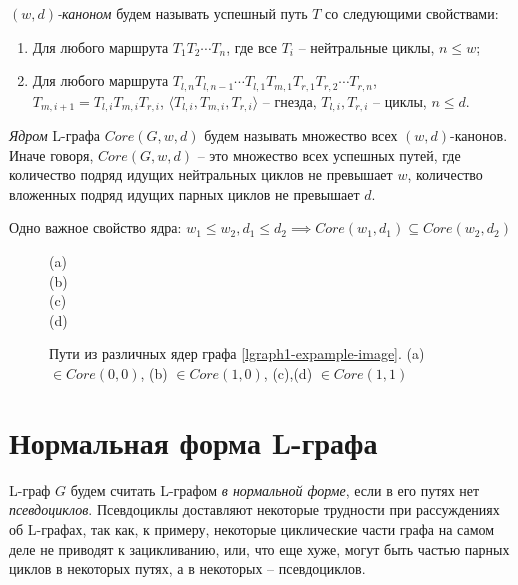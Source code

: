 \emph{$(w,d)$-каноном} будем называть успешный путь $T$ со следующими свойствами:
\begin{enumerate}[label=\arabic*)]
    \item Для любого маршрута $T_1 T_2 \cdots T_n$, где все $T_i$ -- нейтральные циклы, $n \leq w$;
    \item Для любого маршрута $T_{l,n} T_{l,n-1} \cdots T_{l,1} T_{m,1} T_{r,1} T_{r,2} \cdots T_{r,n}$,\\
       $T_{m,i+1} = T_{l,i} T_{m,i} T_{r,i}$, $\langle T_{l,i}, T_{m,i}, T_{r,i} \rangle$ -- гнезда, $T_{l,i}, T_{r,i}$ -- циклы,
       $n \leq d$.
\end{enumerate}

\emph{Ядром} L-графа $Core(G, w, d)$ будем называть множество всех $(w,d)$-канонов. 
Иначе говоря, $Core(G, w, d)$ -- это множество всех успешных путей, 
где количество подряд идущих нейтральных циклов не превышает $w$, 
количество вложенных подряд идущих парных циклов не превышает $d$.  

Одно важное свойство ядра: $w_1 \leq w_2, d_1 \leq d_2 \implies Core(w_1, d_1) \subseteq Core(w_2, d_2)$

\begin{figure}[h]
    \centering
     (a)\\
     (b)\\
     (c)\\
     (d)\\
    
    \caption{Пути из различных ядер графа \ref{lgraph1-expample-image}. (a) $\in Core(0,0)$, (b) $\in Core(1,0)$, (c),(d) $\in Core(1,1)$}
    \label{lgraph1-core-example}
\end{figure}

\section{Нормальная форма L-графа}

L-граф $G$ будем считать L-графом \emph{в нормальной форме}, если в его путях нет \emph{псевдоциклов}.
Псевдоциклы доставляют некоторые трудности при рассуждениях об L-графах, так как, к примеру,
некоторые циклические части графа на самом деле не приводят к зацикливанию, или, что еще хуже, могут
быть частью парных циклов в некоторых путях, а в некоторых -- псевдоциклов. 

\clearpage